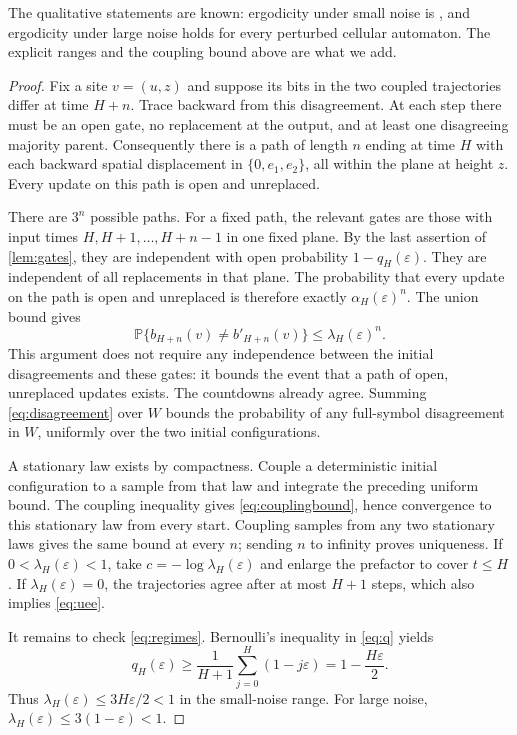 \documentclass[11pt]{article}
\theoremstyle{plain}
\theoremstyle{definition}
\theoremstyle{remark}
\newcommand{\Prob}{\mathbb P}
\newcommand{\eps}{\varepsilon}
\begin{document}
The qualitative statements are known: ergodicity under small noise is \cite[Theorem~3.9]{MST19}, and ergodicity under large noise holds for every perturbed cellular automaton. The explicit ranges and the coupling bound above are what we add.
\begin{proof}
Fix a site $v=(u,z)$ and suppose its bits in the two coupled trajectories differ at time $H+n$. Trace backward from this disagreement. At each step there must be an open gate, no replacement at the output, and at least one disagreeing majority parent. Consequently there is a path of length $n$ ending at time $H$ with each backward spatial displacement in $\{0,e_1,e_2\}$, all within the plane at height $z$. Every update on this path is open and unreplaced.

There are $3^n$ possible paths. For a fixed path, the relevant gates are those with input times $H,H+1,\ldots,H+n-1$ in one fixed plane. By the last assertion of \cref{lem:gates}, they are independent with open probability $1-q_H(\eps)$. They are independent of all replacements in that plane. The probability that every update on the path is open and unreplaced is therefore exactly $\alpha_H(\eps)^n$. The union bound gives
\begin{equation}\label{eq:disagreement}
 \Prob\{b_{H+n}(v)\ne b'_{H+n}(v)\}\leq\lambda_H(\eps)^n.
\end{equation}
This argument does not require any independence between the initial disagreements and these gates: it bounds the event that a path of open, unreplaced updates exists. The countdowns already agree. Summing \eqref{eq:disagreement} over $W$ bounds the probability of any full-symbol disagreement in $W$, uniformly over the two initial configurations.

A stationary law exists by compactness. Couple a deterministic initial configuration to a sample from that law and integrate the preceding uniform bound. The coupling inequality gives \eqref{eq:couplingbound}, hence convergence to this stationary law from every start. Coupling samples from any two stationary laws gives the same bound at every $n$; sending $n$ to infinity proves uniqueness. If $0<\lambda_H(\eps)<1$, take $c=-\log\lambda_H(\eps)$ and enlarge the prefactor to cover $t\leq H$. If $\lambda_H(\eps)=0$, the trajectories agree after at most $H+1$ steps, which also implies \eqref{eq:uee}.

It remains to check \eqref{eq:regimes}. Bernoulli's inequality in \eqref{eq:q} yields
\[
 q_H(\eps)\geq\frac1{H+1}\sum_{j=0}^H(1-j\eps)
 =1-\frac{H\eps}{2}.
\]
Thus $\lambda_H(\eps)\leq3H\eps/2<1$ in the small-noise range. For large noise, $\lambda_H(\eps)\leq3(1-\eps)<1$.
\end{proof}
\end{document}
